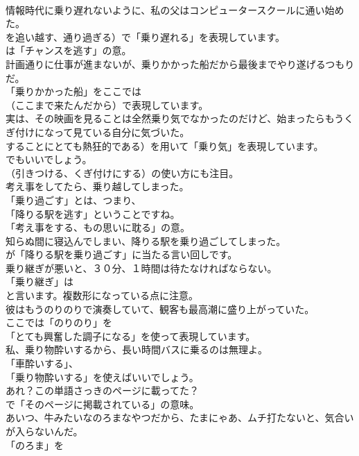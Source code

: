 \documentclass[8pt]{extreport}
\begin{document}
\begin{CJK}{UTF8}{min}
\\	情報時代に乗り遅れないように、私の父はコンピュータースクールに通い始めた。 
\\	を追い越す、通り過ぎる）で「乗り遅れる」を表現しています。
\\	は「チャンスを逃す」の意。	
\\	計画通りに仕事が進まないが、乗りかかった船だから最後までやり遂げるつもりだ。 
\\	「乗りかかった船」をここでは
\\	（ここまで来たんだから）で表現しています。	
\\	実は、その映画を見ることは全然乗り気でなかったのだけど、始まったらもうくぎ付けになって見ている自分に気づいた。 
\\	することにとても熱狂的である）を用いて「乗り気」を表現しています。
\\	でもいいでしょう。
\\	（引きつける、くぎ付けにする）の使い方にも注目。	
\\	考え事をしてたら、乗り越してしまった。 
\\	「乗り過ごす」とは、つまり、
\\	「降りる駅を逃す」ということですね。
\\	「考え事をする、もの思いに耽る」の意。	
\\	知らぬ間に寝込んでしまい、降りる駅を乗り過ごしてしまった。 
\\	が「降りる駅を乗り過ごす」に当たる言い回しです。	
\\	乗り継ぎが悪いと、３０分、１時間は待たなければならない。 
\\	「乗り継ぎ」は
\\	と言います。複数形になっている点に注意。	
\\	彼はもうのりのりで演奏していて、観客も最高潮に盛り上がっていた。 
\\	ここでは「のりのり」を
\\	「とても興奮した調子になる」を使って表現しています。	
\\	私、乗り物酔いするから、長い時間バスに乗るのは無理よ。 
\\	「車酔いする」、
\\	「乗り物酔いする」を使えばいいでしょう。	
\\	あれ？この単語さっきのページに載ってた？ 
\\	で「そのページに掲載されている」の意味。	
\\	あいつ、牛みたいなのろまなやつだから、たまにゃあ、ムチ打たないと、気合いが入らないんだ。 
\\	「のろま」を

\end{CJK}
\end{document}
